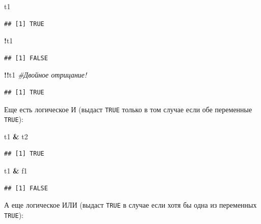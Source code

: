 \documentclass[
]{book}
\newenvironment{Shaded}{\begin{snugshade}}{\end{snugshade}}
\newcommand{\CommentTok}[1]{\textcolor[rgb]{0.56,0.35,0.01}{\textit{#1}}}
\newcommand{\NormalTok}[1]{#1}
\newcommand{\OperatorTok}[1]{\textcolor[rgb]{0.81,0.36,0.00}{\textbf{#1}}}
\newcommand{\StringTok}[1]{\textcolor[rgb]{0.31,0.60,0.02}{#1}}
\begin{document}
\begin{Shaded}
\begin{Highlighting}[]
\NormalTok{t1}
\end{Highlighting}
\end{Shaded}

\begin{verbatim}
## [1] TRUE
\end{verbatim}

\begin{Shaded}
\begin{Highlighting}[]
\OperatorTok{!}\NormalTok{t1}
\end{Highlighting}
\end{Shaded}

\begin{verbatim}
## [1] FALSE
\end{verbatim}

\begin{Shaded}
\begin{Highlighting}[]
\OperatorTok{!!}\NormalTok{t1 }\CommentTok{#Двойное отрицание!}
\end{Highlighting}
\end{Shaded}

\begin{verbatim}
## [1] TRUE
\end{verbatim}

Еще есть логическое И (выдаст \texttt{TRUE} только в том случае если обе переменные \texttt{TRUE}):

\begin{Shaded}
\begin{Highlighting}[]
\NormalTok{t1 }\OperatorTok{&}\StringTok{ }\NormalTok{t2}
\end{Highlighting}
\end{Shaded}

\begin{verbatim}
## [1] TRUE
\end{verbatim}

\begin{Shaded}
\begin{Highlighting}[]
\NormalTok{t1 }\OperatorTok{&}\StringTok{ }\NormalTok{f1}
\end{Highlighting}
\end{Shaded}

\begin{verbatim}
## [1] FALSE
\end{verbatim}

А еще логическое ИЛИ (выдаст \texttt{TRUE} в случае если хотя бы одна из переменных \texttt{TRUE}):
\end{document}
